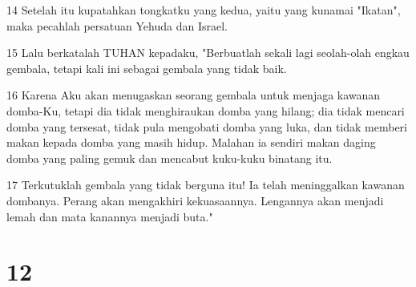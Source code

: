 \par 14 Setelah itu kupatahkan tongkatku yang kedua, yaitu yang kunamai "Ikatan", maka pecahlah persatuan Yehuda dan Israel.
\par 15 Lalu berkatalah TUHAN kepadaku, "Berbuatlah sekali lagi seolah-olah engkau gembala, tetapi kali ini sebagai gembala yang tidak baik.
\par 16 Karena Aku akan menugaskan seorang gembala untuk menjaga kawanan domba-Ku, tetapi dia tidak menghiraukan domba yang hilang; dia tidak mencari domba yang tersesat, tidak pula mengobati domba yang luka, dan tidak memberi makan kepada domba yang masih hidup. Malahan ia sendiri makan daging domba yang paling gemuk dan mencabut kuku-kuku binatang itu.
\par 17 Terkutuklah gembala yang tidak berguna itu! Ia telah meninggalkan kawanan dombanya. Perang akan mengakhiri kekuasaannya. Lengannya akan menjadi lemah dan mata kanannya menjadi buta."

\chapter{12}

